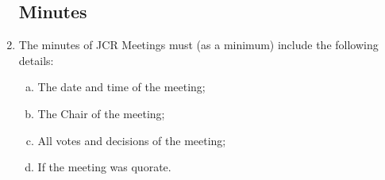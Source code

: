 \documentclass[12pt]{article}  %
\begin{document}
\begin{enumerate}
    \subsection{Minutes}
    \item The minutes of JCR Meetings must (as a minimum) include the following details:
    \begin{enumerate}[(a)]
        \item The date and time of the meeting;
        \item The Chair of the meeting;
        \item All votes and decisions of the meeting;
        \item If the meeting was quorate.
    \end{enumerate}
\end{enumerate}
\newpage
\end{document}
